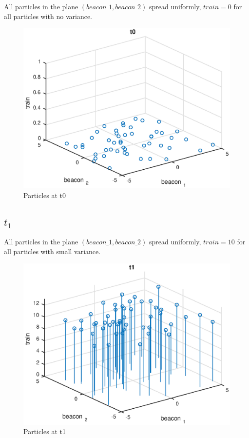\documentclass{article}
\begin{document}
All particles in the plane $(beacon\_1,beacon\_2)$ spread uniformly, $train=0$ for all particles with no variance.

\begin{figure}[H]
	\centering
	\includegraphics[width=0.8\linewidth]{figures/t0.eps}
	\caption{Particles at t0}
	\label{t0}
\end{figure}

\subsection{$t_1$}

All particles in the plane $(beacon\_1,beacon\_2)$ spread uniformly, $train=10$ for all particles with small variance.


\begin{figure}[H]
	\centering
	\includegraphics[width=0.8\linewidth]{figures/t1.eps}
	\caption{Particles at t1}
	\label{t1}
\end{figure}
\end{document}
